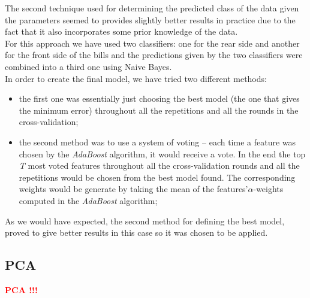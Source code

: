 \documentclass[11pt,twocolumn]{article}
\newcommand{\todo}[1]{\textcolor{red}{\textbf{#1}}}
\begin{document}
			The second technique used for determining the predicted class of the data
			given the parameters seemed to provides slightly better results in practice
			due to the fact that it also incorporates some prior knowledge of the data.\\
			\hspace*{10px}For this approach we have used two classifiers: one for the
			rear side and another for the front side of the bills and the predictions
			given by the two classifiers were combined into a third one using Naive
			Bayes.\\ 
			\hspace*{10px}In order to create the final model, we have tried two different
			methods:
			\begin{itemize}
				\item the first one was essentially just choosing the best model (the one
				that gives the minimum error) throughout all the repetitions and all the
				rounds in the cross-validation;
				\item the second method was to use a system of voting -- each time a
				feature was chosen by the \emph{AdaBoost} algorithm, it would receive a
				vote. In the end the top \emph{T} most voted features throughout all the
				cross-validation rounds and all the repetitions would be chosen from the
				best model found. The corresponding weights would be generate by taking the
				mean of the features\rq\@ $\alpha$-weights computed in the \emph{AdaBoost}
				algorithm;
			\end{itemize}
			As we would have expected, the second method for defining the best model,
			proved to give better results in this case so it was chosen to be applied.
		
		\subsection{PCA}\label{sec:PCA}
			\todo{\hspace*{10px}PCA !!!}
		
\end{document}
